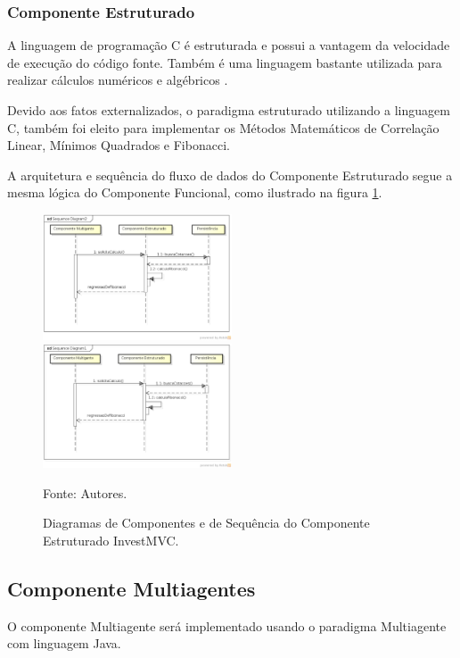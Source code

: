 \subsubsection{Componente Estruturado}

A linguagem de programação C é estruturada e possui a vantagem da velocidade de execução do código fonte. Também é uma linguagem bastante utilizada para realizar cálculos numéricos e algébricos \cite{gustavo}. 

Devido aos fatos externalizados, o paradigma estruturado utilizando a linguagem C, também foi eleito para implementar os Métodos Matemáticos de Correlação Linear, Mínimos Quadrados e Fibonacci.

A arquitetura e sequência do fluxo de dados do Componente Estruturado segue a mesma lógica do Componente Funcional, como ilustrado na figura \ref{sequenciaEstruturado}.

\begin{figure}[htp]
\centering
\includegraphics[width=0.5\textwidth]{figuras/componenteEstruturado}
\includegraphics[width=0.5\textwidth]{figuras/sequenciaEstruturado}
\caption{Diagramas de Componentes e de Sequência do Componente Estruturado InvestMVC.}{Fonte: Autores.} 
\label{sequenciaEstruturado}
\end{figure}

\subsection{Componente Multiagentes}

O componente Multiagente será implementado usando o paradigma Multiagente com linguagem Java. 

